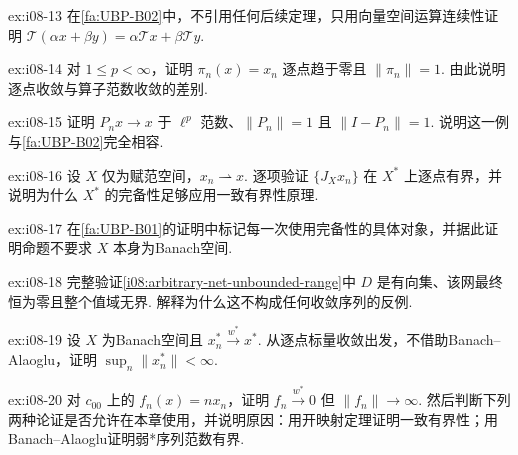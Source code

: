 \begin{FAExercise}[逐点极限算子的线性]{ex:i08-13}
在\autoref{fa:UBP-B02}中，不引用任何后续定理，只用向量空间运算连续性证明 \(\displaystyle \mathcal T(\alpha x+\beta y)=\alpha\mathcal T x+\beta\mathcal T y\).
\end{FAExercise}

\begin{FAExercise}[坐标泛函不按算子范数收敛]{ex:i08-14}
对 \(\displaystyle 1\leqslant p<\infty\)，证明 \(\displaystyle \pi_n(x)=x_n\) 逐点趋于零且 \(\displaystyle \|\pi_n\|=1\). 由此说明逐点收敛与算子范数收敛的差别.
\end{FAExercise}

\begin{FAExercise}[部分坐标投影]{ex:i08-15}
证明 \(\displaystyle P_nx\to x\) 于 \(\displaystyle \ell^p\) 范数、\(\displaystyle \|P_n\|=1\) 且 \(\displaystyle \|I-P_n\|=1\). 说明这一例与\autoref{fa:UBP-B02}完全相容.
\end{FAExercise}

\begin{FAExercise}[弱收敛序列的自然嵌入路线]{ex:i08-16}
设 \(\displaystyle X\) 仅为赋范空间，\(\displaystyle x_n\rightharpoonup x\). 逐项验证 \(\displaystyle \{J_Xx_n\}\) 在 \(\displaystyle X^*\) 上逐点有界，并说明为什么 \(\displaystyle X^*\) 的完备性足够应用一致有界性原理.
\end{FAExercise}

\begin{FAExercise}[为什么原空间不必完备]{ex:i08-17}
在\autoref{fa:UBP-B01}的证明中标记每一次使用完备性的具体对象，并据此证明命题不要求 \(\displaystyle X\) 本身为Banach空间.
\end{FAExercise}

\begin{FAExercise}[任意网的错误扩张]{ex:i08-18}
完整验证\autoref{i08:arbitrary-net-unbounded-range}中 \(\displaystyle D\) 是有向集、该网最终恒为零且整个值域无界. 解释为什么这不构成任何收敛序列的反例.
\end{FAExercise}

\begin{FAExercise}[Banach预对偶上的弱*序列]{ex:i08-19}
设 \(\displaystyle X\) 为Banach空间且 \(\displaystyle x_n^*\overset{w^*}{\longrightarrow}x^*\). 从逐点标量收敛出发，不借助Banach--Alaoglu，证明 \(\displaystyle \sup_n\|x_n^*\|<\infty\).
\end{FAExercise}

\begin{FAExercise}[不完备预对偶与未来定理边界]{ex:i08-20}
对 \(\displaystyle c_{00}\) 上的 \(\displaystyle f_n(x)=nx_n\)，证明 \(\displaystyle f_n\overset{w^*}{\longrightarrow}0\) 但 \(\displaystyle \|f_n\|\to\infty\). 然后判断下列两种论证是否允许在本章使用，并说明原因：用开映射定理证明一致有界性；用Banach--Alaoglu证明弱*序列范数有界.
\end{FAExercise}
